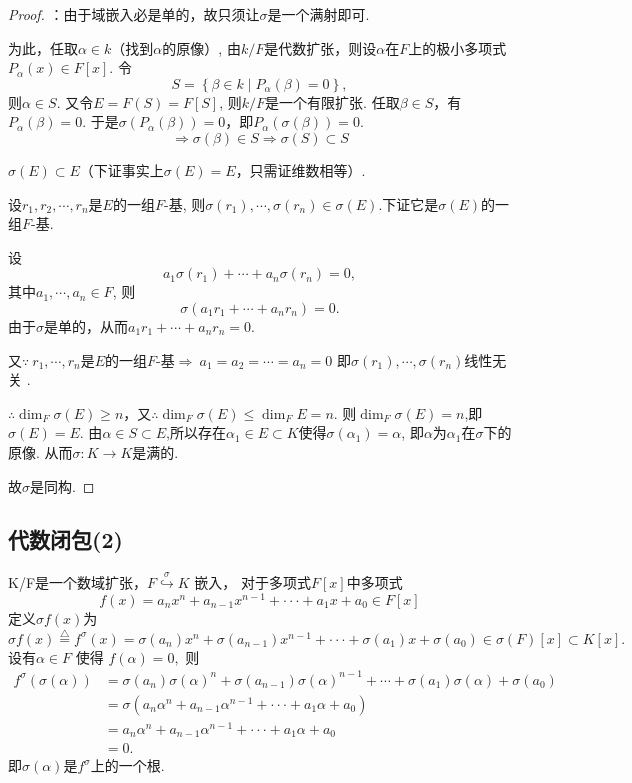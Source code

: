 \documentclass[UTF8]{article}
\begin{document}
\begin{proof}：由于域嵌入必是单的，故只须让$\sigma$是一个满射即可.
	
	
	为此，任取$\alpha\in k$（找到$\alpha$的原像）,
	由$k/F$是代数扩张，则设$\alpha$在$F$上的极小多项式$P_{\alpha}(x)\in F[x]$.
	令
	$$S=\left\{ \beta\in k \mid P_{\alpha}(\beta)=0\right\},$$
	则$\alpha\in S$.
	又令$E=F(S)=F[S]$,
	则$k/F$是一个有限扩张. 
	任取$\beta\in S$，有$P_{\alpha}(\beta)=0$.
	于是$\sigma\left( P_{\alpha}(\beta)\right)=0$，即$P_{\alpha}\left(\sigma\left(\beta\right)\right)=0$.
	$$\Rightarrow\sigma(\beta)\in S\Rightarrow\sigma(S)\subset S$$
	
	$\sigma(E)\subset E$（下证事实上$\sigma(E)=E$，只需证维数相等）.
	
	设$r_{1}, r_{2}, \cdots, r_{n}$是$E$的一组$F$-基,
	则$\sigma\left(r_{1}\right),\cdots,\sigma\left(r_{n}\right) \in \sigma(E)$.下证它是$\sigma(E)$的一组$F$-基.
	
	设
	$$a_1\sigma(r_1)+\cdots+a_n\sigma(r_n)=0,$$
	其中$a_{1},\cdots,a_{n} \in F$,
	则
	$$\sigma\left(a_{1} r_{1}+\cdots+a_{n} r_{n}\right)=0.$$
	由于$\sigma$是单的，从而$a_1r_1+\cdots+a_nr_n=0.$
	
	又$\because\ r_1,\cdots, r_n$是$E$的一组$F$-基$\Rightarrow\ a_{1}=a_{2}=\cdots=a_{n}=0$
	即$\sigma\left(r_{1}\right),\cdots,\sigma\left(r_{n}\right)$线性无关 .
	
	$\therefore\dim_F\sigma(E)\geqslant n$，又$\therefore\dim_F\sigma(E)\leqslant \dim_FE=n$.
	则$\dim_F\sigma(E)=n$,即$\sigma(E)=E$.
	由$\alpha\in S\subset E$,所以存在$\alpha_{1}\in E\subset K$使得$\sigma(\alpha_{1})=\alpha$,
	即$\alpha$为$\alpha_{1}$在$\sigma$下的原像.
	从而$\sigma:K\longrightarrow K$是满的.
	
	故$\sigma$是同构.
	
	
\end{proof}






\subsection{代数闭包(2)}
\normalsize

K/F是一个数域扩张，$F\stackrel{\sigma}{\hookrightarrow} K$ 嵌入，
对于多项式$F[x]$中多项式$$
f(x)=a_nx^n+a_{n-1}x^{n-1}+\cdot\cdot\cdot+a_1x+a_0\in F[x]
$$
定义$\sigma f(x)$为
$$
\sigma f(x)\stackrel{\bigtriangleup}{=}f^{\sigma}(x)=\sigma(a_n)x^n+\sigma(a_{n-1})x^{n-1}+\cdot\cdot\cdot+\sigma(a_1)x+\sigma(a_0)\in {\sigma}(F)[x]\subset K[x].
$$
设有${\alpha}\in F$ 使得 $f({\alpha})=0,$  
则
\[
\begin{split}
f^{\sigma}({\sigma}(\alpha))&=\sigma(a_n){\sigma}(\alpha)^n+\sigma(a_{n-1}){\sigma}(\alpha)^{n-1}+\cdots+\sigma(a_1){\sigma}(\alpha)+\sigma(a_0)\\
&={\sigma}(a_n{\alpha}^n+a_{n-1}{\alpha}^{n-1}+\cdot\cdot\cdot+a_1{\alpha}+a_0)\\
&=a_n{\alpha}^n+a_{n-1}{\alpha}^{n-1}+\cdot\cdot\cdot+a_1{\alpha}+a_0\\
&=0.
\end{split}
\]
即$\sigma(\alpha)$是$f^{\sigma}$上的一个根.
\end{document}
